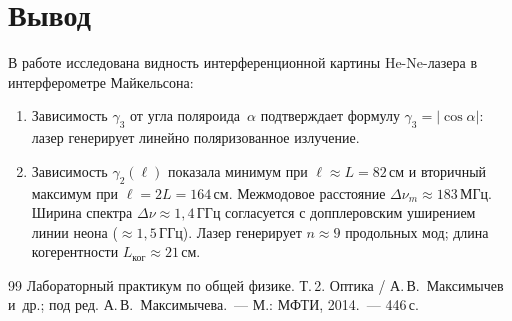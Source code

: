 \documentclass[twoside]{mfitjournal}
\begin{document}
\section*{Вывод}

В работе исследована видность интерференционной картины He-Ne-лазера в интерферометре Майкельсона:

\begin{enumerate}
  \item Зависимость $\gamma_3$ от угла поляроида~$\alpha$ подтверждает формулу
        $\gamma_3 = |\cos\alpha|$: лазер генерирует линейно поляризованное излучение.
  \item Зависимость $\gamma_2(\ell)$ показала минимум при $\ell \approx L = 82$\,см и
        вторичный максимум при $\ell = 2L = 164$\,см. Межмодовое расстояние
        $\Delta\nu_m \approx 183$\,МГц. Ширина спектра $\Delta\nu \approx 1{,}4$\,ГГц
        согласуется с допплеровским уширением линии неона (${\approx}1{,}5$\,ГГц).
        Лазер генерирует $n \approx 9$ продольных мод; длина когерентности
        $L_{\text{ког}} \approx 21$\,см.
\end{enumerate}

\begin{thebibliography}{99}
Лабораторный практикум по общей физике. Т.\,2. Оптика / А.\,В.~Максимычев и~др.;
под ред. А.\,В.~Максимычева.~--- М.: МФТИ, 2014.~--- 446\,с.
\end{thebibliography}
\end{document}
